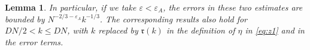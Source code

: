 \documentclass[10pt,reqno]{amsart}
\numberwithin{equation}{section}
\numberwithin{figure}{section}
\theoremstyle{plain} %
\newtheorem{lemma}[theorem]{Lemma}
\theoremstyle{definition} %
\renewcommand{\r}{\mathrm} \newcommand{\rr}{\mathrm} %
\renewcommand{\txt}[1]{\text{\rm{#1}}}
\newcommand{\fr}{{\mathfrak{r}}}
\newcommand{\ii}{\mathrm{i}}
\newcommand{\pa}[1]{\left({#1}\right)}
\newcommand{\avga}[1]{\left\langle #1 \right\rangle}
\DeclareMathOperator{\re}{\mathrm{Re}}
\newcommand{\e}{{\varepsilon}}
\numberwithin{equation}{section}
\begin{document}
\begin{lemma}
        In particular, if we take $\varepsilon<\varepsilon_A$, the errors in these two estimates are bounded by $N^{-2/3-\e_A}k^{-1/3}$. 
        The corresponding results also hold for $DN/2<k\le DN$, with $k$ replaced by $\fr(k)$ in the definition of $\eta$ in \eqref{eq:z1} and in the error terms.
\end{lemma}
\end{document}
